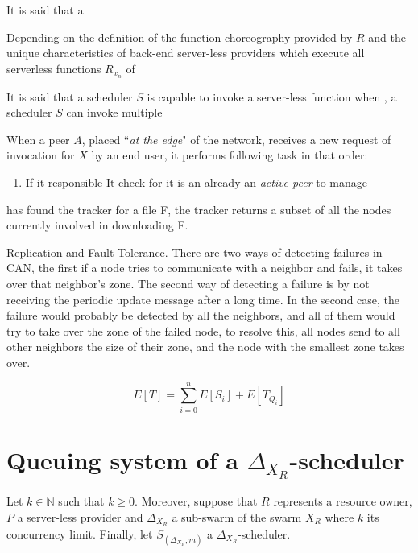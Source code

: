 \documentclass[10pt,a4paper]{article}
\theoremstyle{definition}
\begin{document}
It is said that a 

Depending on the definition of the function choreography provided by $R$ and the unique characteristics of back-end server-less providers which execute all serverless functions $R_{x_n}$ of 




It is said that a scheduler $S$ is capable to invoke a server-less function when 
, a scheduler $S$ can invoke multiple




When a peer $A$, placed ``\textit{at the edge}" of the network, receives a new request of invocation for $X$ by an end user, it performs following task in that order:

\begin{enumerate}
\item If it responsible It check for it is an already an \textit{active peer} to manage 
\end{enumerate}




 has found the tracker for a file F, the tracker returns a subset
of all the nodes currently involved in downloading F.




Replication and Fault Tolerance. There are two ways of detecting failures in CAN,
the first if a node tries to communicate with a neighbor and fails, it takes over that neighbor’s
zone. The second way of detecting a failure is by not receiving the periodic update message
after a long time. In the second case, the failure would probably be detected by all the
neighbors, and all of them would try to take over the zone of the failed node, to resolve this,
all nodes send to all other neighbors the size of their zone, and the node with the smallest
zone takes over.

\newpage


\begin{equation}
E[T] = \sum_{i = 0}^n E[S_i] + E[T_{Q_i}]
\end{equation}

\section{Queuing system of a $\Delta_{X_{R}}$-scheduler}

Let $k \in \mathbb{N}$ such that $k \geq 0$. Moreover, suppose that $R$ represents a resource owner, $P$ a server-less provider and $\Delta_{X_{R}}$ a sub-swarm of the swarm $X_{R}$ where $k$ its concurrency limit. Finally, let $S_{(\Delta_{X_{R}},m)}$ a $\Delta_{X_{R}}$-scheduler. 
\end{document}
